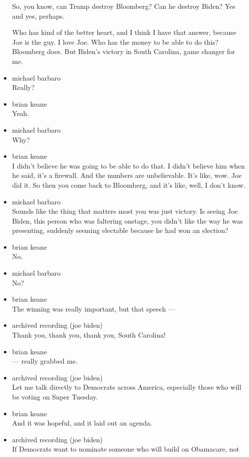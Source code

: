 \begin{itemize}
  So, you know, can Trump destroy Bloomberg? Can he destroy Biden? Yes
  and yes, perhaps.

  Who has kind of the better heart, and I think I have that answer,
  because Joe is the guy. I love Joe. Who has the money to be able to do
  this? Bloomberg does. But Biden's victory in South Carolina, game
  changer for me.
\item
  michael barbaro\\
  Really?
\item
  brian keane\\
  Yeah.
\item
  michael barbaro\\
  Why?
\item
  brian keane\\
  I didn't believe he was going to be able to do that. I didn't believe
  him when he said, it's a firewall. And the numbers are unbelievable.
  It's like, wow. Joe did it. So then you come back to Bloomberg, and
  it's like, well, I don't know.
\item
  michael barbaro\\
  Sounds like the thing that matters most you was just victory. Is
  seeing Joe Biden, this person who was faltering onstage, you didn't
  like the way he was presenting, suddenly seeming electable because he
  had won an election?
\item
  brian keane\\
  No.
\item
  michael barbaro\\
  No?
\item
  brian keane\\
  The winning was really important, but that speech ---
\item
  archived recording (joe biden)\\
  Thank you, thank you, thank you, South Carolina!
\item
  brian keane\\
  --- really grabbed me.
\item
  archived recording (joe biden)\\
  Let me talk directly to Democrats across America, especially those who
  will be voting on Super Tuesday.
\item
  brian keane\\
  And it was hopeful, and it laid out an agenda.
\item
  archived recording (joe biden)\\
  If Democrats want to nominate someone who will build on Obamacare, not

\end{itemize}
